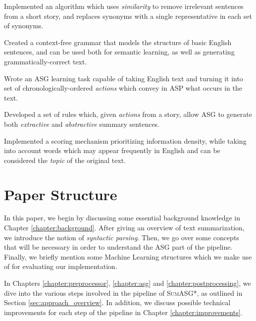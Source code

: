 \begin{contribution}
Implemented an algorithm which uses \textit{similarity} to remove irrelevant sentences from a short story, and replaces synonyms with a single representative in each set of synonyms.
\end{contribution}

\begin{contribution}
Created a context-free grammar that models the structure of basic English sentences, and can be used both for semantic learning, as well as generating grammatically-correct text.
\end{contribution}

\begin{contribution}
Wrote an ASG learning task capable of taking English text and turning it into set of chronologically-ordered \textit{actions} which convey in ASP what occurs in the text.
\end{contribution}

\begin{contribution}
Developed a set of rules which, given \textit{actions} from a story, allow ASG to generate both \textit{extractive} and \textit{abstractive} summary sentences.
\end{contribution}

\begin{contribution}
Implemented a scoring mechanism prioritizing information density, while taking into account words which may appear frequently in English and can be considered the \textit{topic} of the original text.
\end{contribution}

\section{Paper Structure}

In this paper, we begin by discussing some essential background knowledge in Chapter \ref{chapter:background}. After giving an overview of text summarization, we introduce the notion of \textit{syntactic parsing}. Then, we go over some concepts that will be necessary in order to understand the ASG part of the pipeline. Finally, we briefly mention some Machine Learning structures which we make use of for evaluating our implementation.

In Chapters \ref{chapter:preprocessor}, \ref{chapter:asg} and \ref{chapter:postprocessing}, we dive into the various steps involved in the pipeline of \textsc{SumASG*}, as outlined in Section \ref{sec:approach_overview}. In addition, we discuss possible technical improvements for each step of the pipeline in Chapter \ref{chapter:improvements}.

